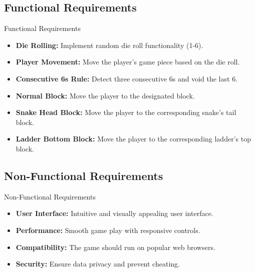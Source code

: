 \documentclass{beamer}
\begin{document}
\subsection{Functional Requirements}
\begin{frame}{Functional Requirements}
      \begin{itemize}
        \item \textbf{Die Rolling:} Implement random die roll functionality (1-6).
        \item \textbf{Player Movement:} Move the player's game piece based on the die roll.
        \item \textbf{Consecutive 6s Rule:} Detect three consecutive 6s and void the last 6.
        \item \textbf{Normal Block:} Move the player to the designated block.
        \item \textbf{Snake Head Block:} Move the player to the corresponding snake's tail block.
        \item \textbf{Ladder Bottom Block:} Move the player to the corresponding ladder's top block.
    \end{itemize}
\end{frame}
\subsection{Non-Functional Requirements}
\begin{frame}{Non-Functional Requirements}
        \begin{itemize}
        \item \textbf{User Interface:} Intuitive and visually appealing user interface.
        \item \textbf{Performance:} Smooth game play with responsive controls.
        \item \textbf{Compatibility:} The game should run on popular web browsers.
        \item \textbf{Security:} Ensure data privacy and prevent cheating.
    \end{itemize}
\end{frame}
\end{document}
